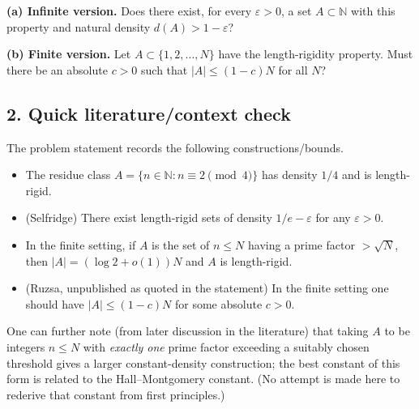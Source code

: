 \medskip
\noindent\textbf{(a) Infinite version.} Does there exist, for every $\varepsilon>0$, a set $A\subset\mathbb{N}$ with this property and natural density $d(A)>1-\varepsilon$?

\medskip
\noindent\textbf{(b) Finite version.} Let $A\subset\{1,2,\dots,N\}$ have the length-rigidity property. Must there be an absolute $c>0$ such that $|A|\le (1-c)N$ for all $N$?

\subsection*{2. Quick literature/context check}
The problem statement records the following constructions/bounds.
\begin{itemize}[leftmargin=2em]
\item The residue class $A=\{n\in\mathbb{N}: n\equiv 2\pmod 4\}$ has density $1/4$ and is length-rigid.
\item (Selfridge) There exist length-rigid sets of density $1/e-\varepsilon$ for any $\varepsilon>0$.
\item In the finite setting, if $A$ is the set of $n\le N$ having a prime factor $>\sqrt{N}$, then $|A|=(\log 2+o(1))N$ and $A$ is length-rigid.
\item (Ruzsa, unpublished as quoted in the statement) In the finite setting one should have $|A|\le (1-c)N$ for some absolute $c>0$.
\end{itemize}

One can further note (from later discussion in the literature) that taking $A$ to be integers $n\le N$ with \emph{exactly one} prime factor exceeding a suitably chosen threshold gives a larger constant-density construction; the best constant of this form is related to the Hall--Montgomery constant. (No attempt is made here to rederive that constant from first principles.)

